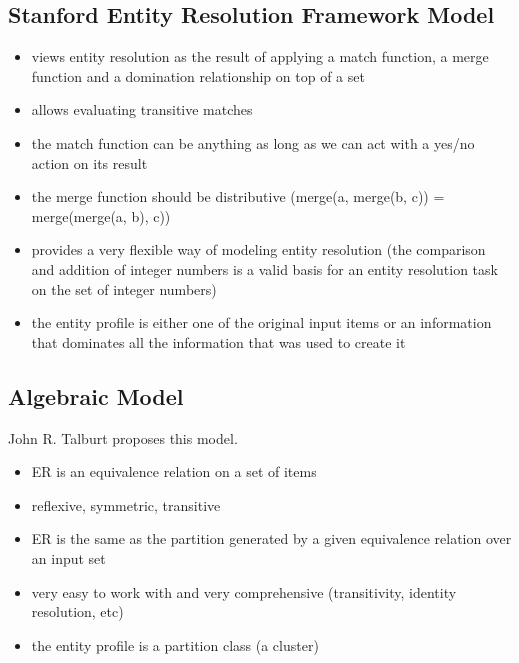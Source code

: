 \documentclass[11pt]{article}
\begin{document}
    \subsection[serf]{Stanford Entity Resolution Framework Model}
    \begin{itemize}
        \item views entity resolution as the result of applying a match function, a merge function and a domination
        relationship on top of a set
        \item allows evaluating transitive matches
        \item the match function can be anything as long as we can act with a yes/no action on its result
        \item the merge function should be distributive (merge(a, merge(b, c)) = merge(merge(a, b), c))
        \item provides a very flexible way of modeling entity resolution (the comparison and addition of integer numbers
        is a valid basis for an entity resolution task on the set of integer numbers)
        \item the entity profile is either one of the original input items or an information that dominates all the
        information that was used to create it
    \end{itemize}

    \subsection[algebraic]{Algebraic Model}
    John R. Talburt proposes this model.
    \begin{itemize}
        \item ER is an equivalence relation on a set of items
        \item reflexive, symmetric, transitive
        \item ER is the same as the partition generated by a given equivalence relation over an input set
        \item very easy to work with and very comprehensive (transitivity, identity resolution, etc)
        \item the entity profile is a partition class (a cluster)
    \end{itemize}
\end{document}
